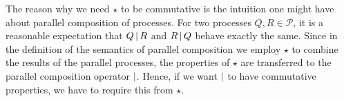 The reason why we need $\star$ to be commutative is the intuition one might have about parallel composition of processes. For two processes $Q, R \in \mathcal{P}$, it is a reasonable expectation that $Q \,|\, R$ and $R \,|\, Q$ behave exactly the same. Since in the definition of the semantics of parallel composition we employ $\star$ to combine the results of the parallel processes, the properties of $\star$ are transferred to the parallel composition operator $|$. Hence, if we want $|$ to have commutative properties, we have to require this from $\star$.







